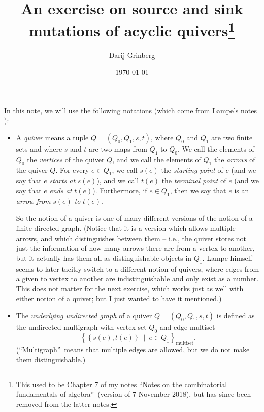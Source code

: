 \documentclass[numbers=enddot,12pt,final,onecolumn,notitlepage]{scrartcl}%
\newcounter{exer}
\numberwithin{exer}{section}
\theoremstyle{definition}
\begin{document}
\title{An exercise on source and sink mutations of acyclic quivers\thanks{This used
to be Chapter 7 of my notes \textquotedblleft Notes on the combinatorial
fundamentals of algebra\textquotedblright\ (version of 7 November 2018), but
has since been removed from the latter notes.}}
\author{Darij Grinberg}
\date{
\today
}
\maketitle

In this note, we will use the following notations (which come from Lampe's
notes \cite[\S 2.1.1]{Lampe}):

\begin{itemize}
\item A \textit{quiver} means a tuple $Q=\left(  Q_{0},Q_{1},s,t\right)  $,
where $Q_{0}$ and $Q_{1}$ are two finite sets and where $s$ and $t$ are two
maps from $Q_{1}$ to $Q_{0}$. We call the elements of $Q_{0}$ the
\textit{vertices} of the quiver $Q$, and we call the elements of $Q_{1}$ the
\textit{arrows} of the quiver $Q$. For every $e\in Q_{1}$, we call $s\left(
e\right)  $ the \textit{starting point} of $e$ (and we say that $e$
\textit{starts at }$s\left(  e\right)  $), and we call $t\left(  e\right)  $
the \textit{terminal point} of $e$ (and we say that $e$ \textit{ends at}
$t\left(  e\right)  $). Furthermore, if $e\in Q_{1}$, then we say that $e$ is
an \textit{arrow from }$s\left(  e\right)  $ \textit{to }$t\left(  e\right)  $.

So the notion of a quiver is one of many different versions of the notion of a
finite directed graph. (Notice that it is a version which allows multiple
arrows, and which distinguishes between them -- i.e., the quiver stores not
just the information of how many arrows there are from a vertex to another,
but it actually has them all as distinguishable objects in $Q_{1}$. Lampe
himself seems to later tacitly switch to a different notion of quivers, where
edges from a given to vertex to another are indistinguishable and only exist
as a number. This does not matter for the next exercise, which works just as
well with either notion of a quiver; but I just wanted to have it mentioned.)

\item The \textit{underlying undirected graph} of a quiver $Q=\left(
Q_{0},Q_{1},s,t\right)  $ is defined as the undirected multigraph with vertex
set $Q_{0}$ and edge multiset%
\[
\left\{  \left\{  s\left(  e\right)  ,t\left(  e\right)  \right\}
\ \mid\ e\in Q_{1}\right\}  _{\operatorname*{multiset}}.
\]
(\textquotedblleft Multigraph\textquotedblright\ means that multiple edges are
allowed, but we do not make them distinguishable.)


\end{itemize}
\end{document}
